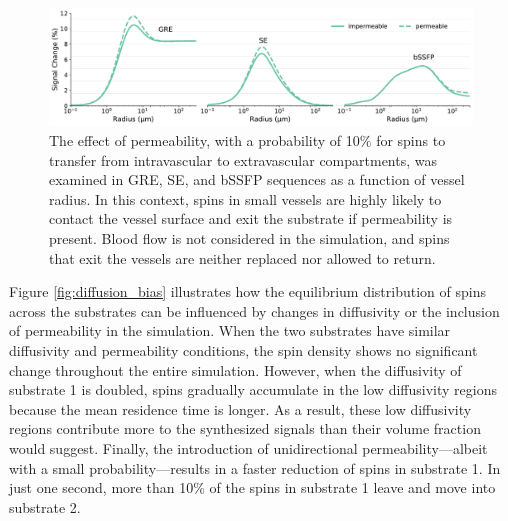 \begin{figure}[!htbp]
    \centering
    \includegraphics[width=\textwidth]{fig7_permeability.pdf}
    \caption{The effect of permeability, with a probability of 10\% for spins to transfer from intravascular to extravascular compartments, was examined in GRE, SE, and bSSFP sequences as a function of vessel radius. In this context, spins in small vessels are highly likely to contact the vessel surface and exit the substrate if permeability is present. Blood flow is not considered in the simulation, and spins that exit the vessels are neither replaced nor allowed to return. }
    \label{fig:permeability}
\end{figure}


Figure \ref{fig:diffusion_bias} illustrates how the equilibrium distribution of spins across the substrates can be influenced by changes in diffusivity or the inclusion of permeability in the simulation. When the two substrates have similar diffusivity and permeability conditions, the spin density shows no significant change throughout the entire simulation. However, when the diffusivity of substrate 1 is doubled, spins gradually accumulate in the low diffusivity regions because the mean residence time is longer. As a result, these low diffusivity regions contribute more to the synthesized signals than their volume fraction would suggest. Finally, the introduction of unidirectional permeability—albeit with a small probability—results in a faster reduction of spins in substrate 1. In just one second, more than 10\% of the spins in substrate 1 leave and move into substrate 2.

